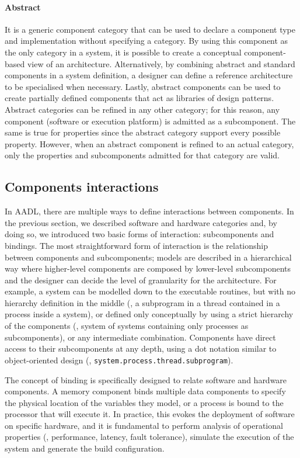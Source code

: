 \paragraph{Abstract} It is a generic component category that can be used to declare a component type and implementation without specifying a category. By using this component as the only category in a system, it is possible to create a conceptual component-based view of an architecture. Alternatively, by combining abstract and standard components in a system definition, a designer can define a reference architecture to be specialised when necessary. Lastly, abstract components can be used to create partially defined components that act as libraries of design patterns. Abstract categories can be refined in any other category; for this reason, any component (software or execution platform) is admitted as a subcomponent. The same is true for properties since the abstract category support every possible property. However, when an abstract component is refined to an actual category, only the properties and subcomponents admitted for that category are valid.

\subsection{Components interactions}
In AADL, there are multiple ways to define interactions between components. In the previous section, we described software and hardware categories and, by doing so, we introduced two basic forms of interaction: subcomponents and bindings. The most straightforward form of interaction is the relationship between components and subcomponents; models are described in a hierarchical way where higher-level components are composed by lower-level subcomponents and the designer can decide the level of granularity for the architecture. For example, a system can be modelled down to the executable routines, but with no hierarchy definition in the middle (\ie, a subprogram in a thread contained in a process inside a system), or defined only conceptually by using a strict hierarchy of the components (\ie, system of systems containing only processes as subcomponents), or any intermediate combination. Components have direct access to their subcomponents at any depth, using a dot notation similar to object-oriented design (\eg, \texttt{system.process.thread.subprogram}).

The concept of binding is specifically designed to relate software and hardware components. A memory component binds multiple data components to specify the physical location of the variables they model, or a process is bound to the processor that will execute it. In practice, this evokes the deployment of software on specific hardware, and it is fundamental to perform analysis of operational properties (\eg, performance, latency, fault tolerance), simulate the execution of the system and generate the build configuration.

